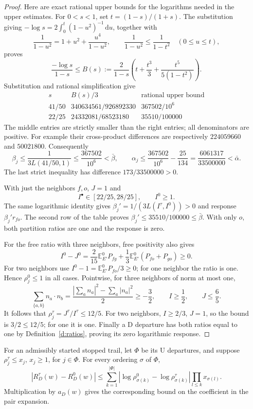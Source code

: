 \begin{proof}
Here are exact rational upper bounds for the logarithms needed in
the upper estimates. For \(0<s<1\), set \(t=(1-s)/(1+s)\).
The substitution giving
\(-\log s=2\int_0^t(1-u^2)^{-1}\,\mathrm du\), together with
\[
 \frac1{1-u^2}=1+u^2+\frac{u^4}{1-u^2},\qquad
 \frac1{1-u^2}\le\frac1{1-t^2}\quad(0\le u\le t),
\]
proves
\[
 \frac{-\log s}{1-s}\le
 B(s):=\frac2{1-s}
       \left(t+\frac{t^3}{3}+\frac{t^5}{5(1-t^2)}\right).
\]
Substitution and rational simplification give
\[
 \begin{array}{c|c|c}
 s&B(s)/3&\text{rational upper bound}\\ \hline
 41/50&340634561/926892330&367502/10^6\\
 22/25&24332081/68523180&35510/100000
 \end{array}
\]
The middle entries are strictly smaller than the right entries;
all denominators are positive. For example their cross-product
differences are respectively \(224059660\) and \(50021800\).
Consequently
\[
 \beta_j\le\frac1{3L(41/50,1)}
       \le\frac{367502}{10^6}<\bar\beta,\qquad
 \alpha_j\le\frac{367502}{10^6}-\frac{25}{134}
       =\frac{6061317}{33500000}<\bar\alpha.
\]
The last strict inequality has difference
\(173/33500000>0\).

With just the neighbors \(f,o\), \(J=1\) and
\[
 I^\bullet\in[22/25,28/25],\qquad I^0\ge1.
\]
The same logarithmic identity gives
\(\beta_j'=1/(3L(I^\tau,I^0))>0\) and response
\(\beta_j'r_{fo}\). The second row of the table proves
\(\beta_j'\le35510/100000\le\bar\beta\).
With only \(o\), both partition ratios are one and the response
is zero.

For the free ratio with three neighbors, free positivity also gives
\[
 I^0-J^0
 =\frac2{15}\mathbb E^0_{E'}P_{fg}
      +\frac13\mathbb E^0_{E'}(P_{fo}+P_{go})\ge0.
\]
For two neighbors use \(I^0-1=\mathbb E^0_{E'}P_{fo}/3\ge0\);
for one neighbor the ratio is one. Hence \(\rho_j^0\le1\)
in all cases. Pointwise, for three neighbors of norm at most one,
\[
 \sum_{\{a,b\}}n_a\cdot n_b
   =\frac{|\sum_a n_a|^2-\sum_a|n_a|^2}{2}\ge-\frac32,
 \qquad I\ge\frac12,\qquad J\le\frac65.
\]
It follows that \(\rho_j^\tau=J^\tau/I^\tau\le12/5\).
For two neighbors, \(I\ge2/3\), \(J=1\), so the bound is
\(3/2\le12/5\); for one it is one.
Finally a \(\mathrm D\) departure has both ratios equal to one
by Definition~\ref{d:ratios}, proving its zero logarithmic response.
\end{proof}

\begin{lemma}\label{l:exposure}
For an admissibly started stopped trail, let \(\Phi\) be its
\(\mathrm U\) departures, and suppose \(\rho_j^\tau\le x_j\),
\(x_j\ge1\), for \(j\in\Phi\).
For every ordering \(\sigma\) of \(\Phi\),
\[
 |R_D^\tau(w)-R_D^0(w)|
 \le\sum_{k=1}^{|\Phi|}
       |\log\rho_{\sigma(k)}^0-\log\rho_{\sigma(k)}^\tau|
                         \prod_{l\le k}x_{\sigma(l)}.
\]
Multiplication by \(a_D(w)\) gives the corresponding bound on the
coefficient in the pair expansion.
\end{lemma}

